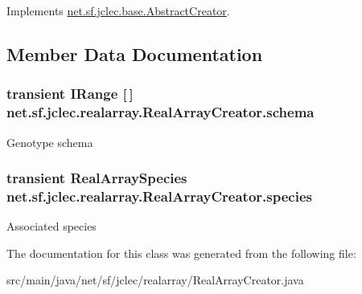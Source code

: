 Implements \hyperlink{classnet_1_1sf_1_1jclec_1_1base_1_1_abstract_creator_a75beaef8489c52782e0c7c956c2beaf7}{net.\-sf.\-jclec.\-base.\-Abstract\-Creator}.



\subsection{Member Data Documentation}
\hypertarget{classnet_1_1sf_1_1jclec_1_1realarray_1_1_real_array_creator_a860325fb147c4c67117d23067ff118de}{
\subsubsection[{schema}]{\setlength{\rightskip}{0pt plus 5cm}transient {\bf I\-Range} \mbox{[}$\,$\mbox{]} net.\-sf.\-jclec.\-realarray.\-Real\-Array\-Creator.\-schema\hspace{0.3cm}{\ttfamily [protected]}}}\label{classnet_1_1sf_1_1jclec_1_1realarray_1_1_real_array_creator_a860325fb147c4c67117d23067ff118de}
Genotype schema \hypertarget{classnet_1_1sf_1_1jclec_1_1realarray_1_1_real_array_creator_a1d61f58826a48f2fc1127b452dc65b70}{
\subsubsection[{species}]{\setlength{\rightskip}{0pt plus 5cm}transient {\bf Real\-Array\-Species} net.\-sf.\-jclec.\-realarray.\-Real\-Array\-Creator.\-species\hspace{0.3cm}{\ttfamily [protected]}}}\label{classnet_1_1sf_1_1jclec_1_1realarray_1_1_real_array_creator_a1d61f58826a48f2fc1127b452dc65b70}
Associated species 

The documentation for this class was generated from the following file\-:\begin{DoxyCompactItemize}
\item 
src/main/java/net/sf/jclec/realarray/Real\-Array\-Creator.\-java\end{DoxyCompactItemize}
